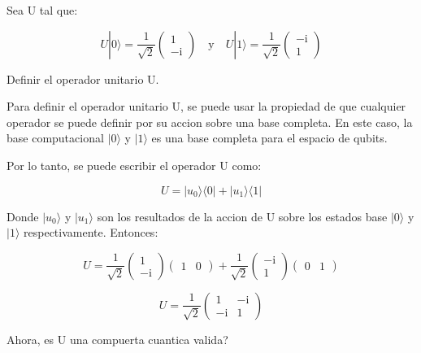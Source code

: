 \documentclass[11pt]{article}
\newcommand{\ii}{\mathrm{i}}
\begin{document}
Sea U tal que:

\begin{equation}
    U |0\rangle = \frac{1}{\sqrt{2}} \begin{pmatrix} 1 \\ -\ii \end{pmatrix} \quad \text{y} \quad U |1\rangle = \frac{1}{\sqrt{2}} \begin{pmatrix} -\ii \\ 1 \end{pmatrix}
\end{equation}

Definir el operador unitario U.

Para definir el operador unitario U, se puede usar la propiedad de que cualquier operador se puede definir por su accion sobre una base completa. En este caso, la base computacional $|0\rangle$ y $|1\rangle$ es una base completa para el espacio de qubits.

Por lo tanto, se puede escribir el operador U como:

\begin{equation}
    U = |u_0\rangle \langle 0| + |u_1\rangle \langle 1|
\end{equation}

Donde $|u_0\rangle$ y $|u_1\rangle$ son los resultados de la accion de U sobre los estados base $|0\rangle$ y $|1\rangle$ respectivamente. Entonces:

\begin{equation}
    U = \frac{1}{\sqrt{2}} \begin{pmatrix} 1 \\ -\ii \end{pmatrix} \begin{pmatrix} 1 & 0 \end{pmatrix} + \frac{1}{\sqrt{2}} \begin{pmatrix} -\ii \\ 1 \end{pmatrix} \begin{pmatrix} 0 & 1 \end{pmatrix}
\end{equation}

\begin{equation}
    U = \frac{1}{\sqrt{2}} \begin{pmatrix} 1 & -\ii \\ -\ii & 1 \end{pmatrix}
\end{equation}

Ahora, es U una compuerta cuantica valida? 
\end{document}
